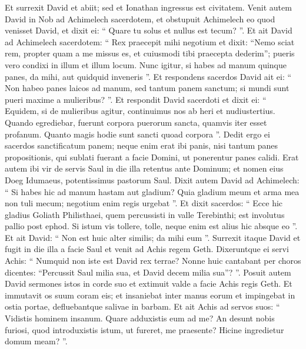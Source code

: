 \begin{biblechapter}
\begin{biblechapter}
\begin{biblechapter}
\begin{biblechapter}
\begin{biblechapter}
\begin{biblechapter}
\begin{biblechapter}
\begin{biblechapter}
\begin{biblechapter}
\begin{biblechapter}
\begin{biblechapter}
\begin{biblechapter}
\begin{biblechapter}
\begin{biblechapter}
\begin{biblechapter}
\begin{biblechapter}
\begin{biblechapter}
\begin{biblechapter}
\begin{biblechapter}
\begin{biblechapter}
\begin{biblechapter}
\verse Et surrexit David et abiit; sed et Ionathan ingressus est civitatem. 
 \verse Venit autem David in Nob ad Achimelech sacerdotem, et obstupuit Achimelech eo quod venisset David, et dixit ei: “ Quare tu solus et nullus est tecum? ”. 
\verse Et ait David ad Achimelech sacerdotem: “ Rex praecepit mihi negotium et dixit: “Nemo sciat rem, propter quam a me missus es, et cuiusmodi tibi praecepta dederim”; pueris vero condixi in illum et illum locum. 
\verse Nunc igitur, si habes ad manum quinque panes, da mihi, aut quidquid inveneris ”.
 \verse Et respondens sacerdos David ait ei: “ Non habeo panes laicos ad manum, sed tantum panem sanctum; si mundi sunt pueri maxime a mulieribus? ”. 
\verse Et respondit David sacerdoti et dixit ei: “ Equidem, si de mulieribus agitur, continuimus nos ab heri et nudiustertius. Quando egrediebar, fuerunt corpora puerorum sancta, quamvis iter esset profanum. Quanto magis hodie sunt sancti quoad corpora ”. 
\verse Dedit ergo ei sacerdos sanctificatum panem; neque enim erat ibi panis, nisi tantum panes propositionis, qui sublati fuerant a facie Domini, ut ponerentur panes calidi.
 \verse Erat autem ibi vir de servis Saul in die illa retentus ante Dominum; et nomen eius Doeg Idumaeus, potentissimus pastorum Saul.
 \verse Dixit autem David ad Achimelech: “ Si habes hic ad manum hastam aut gladium? Quia gladium meum et arma mea non tuli mecum; negotium enim regis urgebat ”. 
\verse Et dixit sacerdos: “ Ecce hic gladius Goliath Philisthaei, quem percussisti in valle Terebinthi; est involutus pallio post ephod. Si istum vis tollere, tolle, neque enim est alius hic absque eo ”. Et ait David: “ Non est huic alter similis; da mihi eum ”.
 \verse Surrexit itaque David et fugit in die illa a facie Saul et venit ad Achis regem Geth. 
\verse Dixeruntque ei servi Achis: “ Numquid non iste est David rex terrae? Nonne huic cantabant per choros dicentes: “Percussit Saul milia sua, et David decem milia sua”? ”.
 \verse Posuit autem David sermones istos in corde suo et extimuit valde a facie Achis regis Geth. 
\verse Et immutavit os suum coram eis; et insaniebat inter manus eorum et impingebat in ostia portae, defluebantque salivae in barbam. 
 \verse Et ait Achis ad servos suos: “ Vidistis hominem insanum. Quare adduxistis eum ad me? 
\verse An desunt nobis furiosi, quod introduxistis istum, ut fureret, me praesente? Hicine ingredietur domum meam? ”.
 

\end{biblechapter}
\end{biblechapter}
\end{biblechapter}
\end{biblechapter}
\end{biblechapter}
\end{biblechapter}
\end{biblechapter}
\end{biblechapter}
\end{biblechapter}
\end{biblechapter}
\end{biblechapter}
\end{biblechapter}
\end{biblechapter}
\end{biblechapter}
\end{biblechapter}
\end{biblechapter}
\end{biblechapter}
\end{biblechapter}
\end{biblechapter}
\end{biblechapter}
\end{biblechapter}
